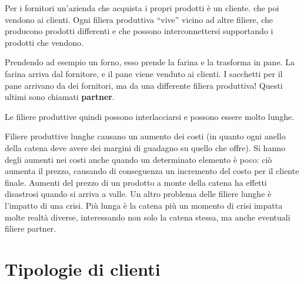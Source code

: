 \noindent Per i fornitori un'azienda che acquista i propri prodotti è un 
cliente.  che poi vendono ai 
clienti. Ogni filiera produttiva ``vive'' vicino ad altre filiere, che producono 
prodotti differenti e che possono interconnettersi supportando i prodotti che 
vendono.

\begin{example}[Forno]
Prendendo ad esempio un forno, esso prende la farina e la trasforma in pane. La
farina arriva dal fornitore, e il pane viene venduto ai clienti. I sacchetti
per il pane arrivano da dei fornitori, ma da una differente filiera produttiva!
Questi ultimi sono chiamati \textbf{partner}.
\end{example}

\noindent Le filiere produttive quindi possono interlacciarsi e possono essere 
molto lunghe.

Filiere produttive lunghe causano un aumento dei costi (in quanto ogni anello
della catena deve avere dei margini di guadagno su quello che offre). Si hanno
degli aumenti nei costi anche quando un determinato elemento è poco: ciò
aumenta il prezzo, causando di conseguenza un incremento del costo per il
cliente finale. Aumenti del prezzo di un prodotto a monte della catena ha
effetti disastrosi quando si arriva a valle. Un altro problema delle filiere
lunghe è l'impatto di una crisi. Più lunga è la catena più un momento di crisi
impatta molte realtà diverse, interessando non solo la catena stessa, ma anche
eventuali filiere partner.

\section{Tipologie di clienti}

